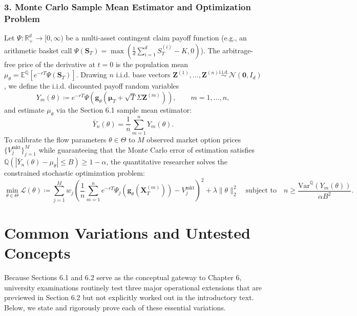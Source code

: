 \documentclass[11pt, letterpaper]{article}
\theoremstyle{definition}
\theoremstyle{remark}
\newcommand{\R}{\mathbb{R}}
\newcommand{\E}{\mathbb{E}}
\begin{document}
\subsubsection*{3. Monte Carlo Sample Mean Estimator and Optimization Problem}
Let $\Psi : \R^d_+ \to [0, \infty)$ be a multi-asset contingent claim payoff function (e.g., an arithmetic basket call $\Psi(\mathbf{S}_T) = \max\left(\frac{1}{d}\sum_{i=1}^d S_T^{(i)} - K, 0\right)$). The arbitrage-free price of the derivative at $t = 0$ is the population mean $\mu_{\theta} = \E^{\mathbb{Q}}\left[e^{-rT}\Psi(\mathbf{S}_T)\right]$. Drawing $n$ i.i.d. base vectors $\mathbf{Z}^{(1)}, \dots, \mathbf{Z}^{(n)} \stackrel{\text{i.i.d.}}{\sim} \mathcal{N}(\mathbf{0}, I_d)$, we define the i.i.d. discounted payoff random variables
\[
    Y_m(\theta) \coloneqq e^{-rT} \Psi\left( \mathbf{g}_{\theta}\left(\boldsymbol{\mu}_T + \sqrt{T}\Sigma \mathbf{Z}^{(m)}\right) \right), \qquad m = 1, \dots, n,
\]
and estimate $\mu_{\theta}$ via the Section 6.1 sample mean estimator:
\[
    \bar{Y}_n(\theta) = \frac{1}{n} \sum_{m=1}^{n} Y_m(\theta).
\]
To calibrate the flow parameters $\theta \in \Theta$ to $M$ observed market option prices $\{V_j^{\text{mkt}}\}_{j=1}^M$ while guaranteeing that the Monte Carlo error of estimation satisfies $\mathbb{Q}\left(|\bar{Y}_n(\theta) - \mu_{\theta}| \le B\right) \ge 1 - \alpha$, the quantitative researcher solves the constrained stochastic optimization problem:
\[
    \min_{\theta \in \Theta} \mathcal{L}(\theta) \coloneqq \sum_{j=1}^{M} w_j \left( \frac{1}{n} \sum_{m=1}^{n} e^{-rT} \Psi_j\left(\mathbf{g}_{\theta}(\mathbf{X}_T^{(m)})\right) - V_j^{\text{mkt}} \right)^2 + \lambda \|\theta\|_2^2 \quad \text{subject to} \quad n \ge \frac{\text{Var}^{\mathbb{Q}}(Y_m(\theta))}{\alpha B^2}.
\]

\newpage

\section{Common Variations and Untested Concepts}

Because Sections 6.1 and 6.2 serve as the conceptual gateway to Chapter 6, university examinations routinely test three major operational extensions that are previewed in Section 6.2 but not explicitly worked out in the introductory text. Below, we state and rigorously prove each of these essential variations.
\end{document}

